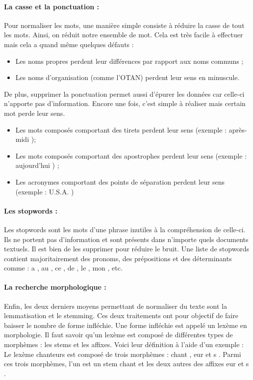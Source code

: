                 \paragraph{La casse et la ponctuation :}
                    Pour normaliser les mots, une manière simple consiste à réduire la casse de tout les mots. Ainsi, on réduit notre ensemble de mot. Cela est très facile à effectuer mais cela a quand même quelques défauts :
                    \begin{itemize}
                        \item Les noms propres perdent leur différences par rapport aux noms communs ;
                        \item Les noms d'organisation (comme l'OTAN) perdent leur sens en minuscule.
                    \end{itemize}
                    De plus, supprimer la ponctuation permet aussi d'épurer les données car celle-ci n'apporte pas d'information. Encore une fois, c'est simple à réaliser mais certain mot perde leur sens.
                    \begin{itemize}
                        \item Les mots composés comportant des tirets perdent leur sens (exemple : \og après-midi \fg);
                        \item Les mots composés comportant des apostrophes perdent leur sens (exemple : \og aujourd'hui \fg) ;
                        \item Les acronymes comportant des points de séparation perdent leur sens (exemple : \og U.S.A. \fg)
                    \end{itemize}

                \paragraph{Les stopwords :}
                    Les stopwords sont les mots d'une phrase inutiles à la compréhension de celle-ci. Ils ne portent pas d'information et sont présents dans n'importe quels documents textuels. Il est bien de les supprimer pour réduire le bruit. Une liste de stopwords contient majoritairement des pronoms, des prépositions et des déterminants comme : \og a \fg, \og au \fg, \og ce \fg, \og de \fg, \og le \fg, \og mon \fg, etc.

                \paragraph{La recherche morphologique :}
                    Enfin, les deux derniers moyens permettant de normaliser du texte sont la lemmatisation et le stemming. Ces deux traitements ont pour objectif de faire baisser le nombre de forme infléchie. Une forme infléchie est appelé un lexème en morphologie. Il faut savoir qu'un lexème est composé de différentes types de morphèmes : les stems et les affixes. Voici leur définition à l'aide d'un exemple :\\
                    Le lexème \og chanteurs \fg est composé de trois morphèmes : \og chant \fg, \og eur \fg et \og s \fg. Parmi ces trois morphèmes, l'un est un stem \og chant \fg et les deux autres des affixes \og eur \fg et \og s \fg.


